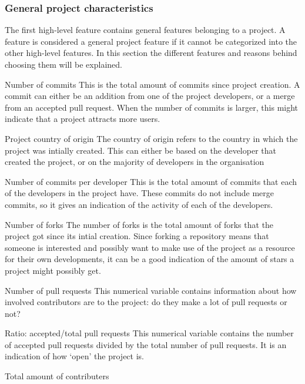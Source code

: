     \subsubsection{General project characteristics}
    The first high-level feature contains general features belonging to a project. 
    A feature is considered a general project feature if it cannot be categorized into the other high-level features.
    In this section the different features and reasons behind choosing them will be explained.
    \begin{LaTeXdescription}
        \item[Number of commits]
        This is the total amount of commits since project creation.
        A commit can either be an addition from one of the project developers, or a merge from an accepted pull request.
        When the number of commits is larger, this might indicate that a project attracts more users.
        \item[Project country of origin]
        The country of origin refers to the country in which the project was intially created.
        This can either be based on the developer that created the project, or on the majority of developers in the organisation
        \item[Number of commits per developer]
        This is the total amount of commits that each of the developers in the project have.
        These commits do not include merge commits, so it gives an indication of the activity of each of the developers.
        \item[Number of forks]
        The number of forks is the total amount of forks that the project got since its intial creation.
        Since forking a repository means that someone is interested and possibly want to make use of the project as a resource for their own developments, it can be a good indication of the amount of stars a project might possibly get.
        \item[Number of pull requests]
        This numerical variable contains information about how involved contributors are to the project: do they make a lot of pull requests or not?
        \item[Ratio: accepted/total pull requests]
        This numerical variable contains the number of accepted pull requests divided by the total number of pull requests. It is an indication of how `open' the project is.
        \item[Total amount of contributers]

\end{LaTeXdescription}
